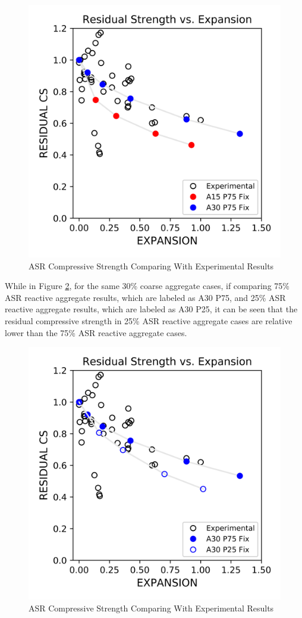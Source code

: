 \begin{figure}[ht!]
\centering
\includegraphics[width=.8\linewidth]{Files/CS_plot/ASRCS2.png}
  \caption{ASR Compressive Strength Comparing With Experimental Results}
  \label{ASRA30vsA15_cs}
\end{figure}

While in Figure \ref{A30P25vs75}, for the same 30\% coarse aggregate cases, if comparing 75\% ASR reactive aggregate results, which are labeled as A30 P75, and 25\% ASR reactive aggregate results, which are labeled as A30 P25, it can be seen that the residual compressive strength in 25\% ASR reactive aggregate cases are relative lower than the 75\% ASR reactive aggregate cases.

\begin{figure}[ht!]
\centering
\includegraphics[width=.8\linewidth]{Files/CS_plot/ASRCS3.png}
  \caption{ASR Compressive Strength Comparing With Experimental Results}
  \label{A30P25vs75}
\end{figure}

